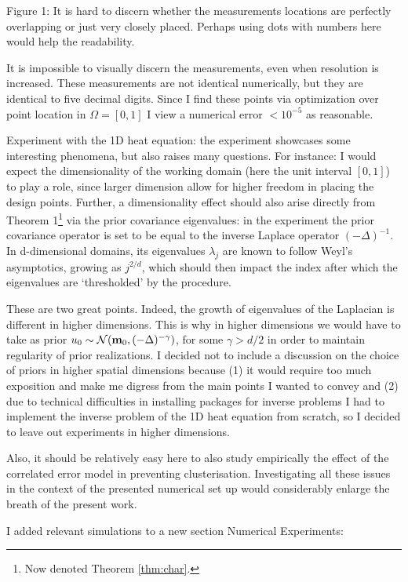 \RC Figure 1: It is hard to discern whether the measurements locations
are perfectly overlapping or just very closely placed. Perhaps using
dots with numbers here would help the readability.
  
\AR It is impossible to visually discern the measurements, even when
resolution is increased. These measurements are not identical
numerically, but they are identical to five decimal digits. Since I
find these points via optimization over point location in
$\Omega=[0,1]$ I view a numerical error $<10^{-5}$ as reasonable.

\RC Experiment with the 1D heat equation: the experiment showcases
some interesting phenomena, but also raises many questions. For
instance: I would expect the dimensionality of the working domain
(here the unit interval $[0, 1]$) to play a role, since larger
dimension allow for higher freedom in placing the design points.
Further, a dimensionality effect should also arise directly from
Theorem 1\footnote{Now denoted Theorem \ref{thm:char}.} via the prior
covariance eigenvalues: in the experiment the prior covariance
operator is set to be equal to the inverse Laplace operator
$(-\Delta)^{-1}$. In d-dimensional domains, its eigenvalues
$\lambda_j$ are known to follow Weyl’s asymptotics, growing as
$j^{2/d}$, which should then impact the index after which the
eigenvalues are ‘thresholded’ by the procedure.

\AR These are two great points. Indeed, the growth of eigenvalues of
the Laplacian is different in higher dimensions. This is why in higher
dimensions we would have to take as prior \(u_0 \sim
\mathcal{N}(\mathbf{m}_0, (-\Delta)^{-\gamma})\), for some \(\gamma >
d/2\) in order to maintain regularity of prior realizations. I decided
not to include a discussion on the choice of priors in higher spatial
dimensions because (1) it would require too much exposition and make
me digress from the main points I wanted to convey and (2) due to
technical difficulties in installing packages for inverse problems
\cite{attia2023pyoed, villa18} I had to implement the inverse problem
of the 1D heat equation from scratch, so I decided to leave out
experiments in higher dimensions.

  
\RC Also, it should be relatively easy here to also study empirically
the effect of the correlated error model in preventing
clusterisation. Investigating all these issues in the context of the
presented numerical set up would considerably enlarge the breath of
the present work.

\AR I added relevant simulations to a new section Numerical
Experiments:



